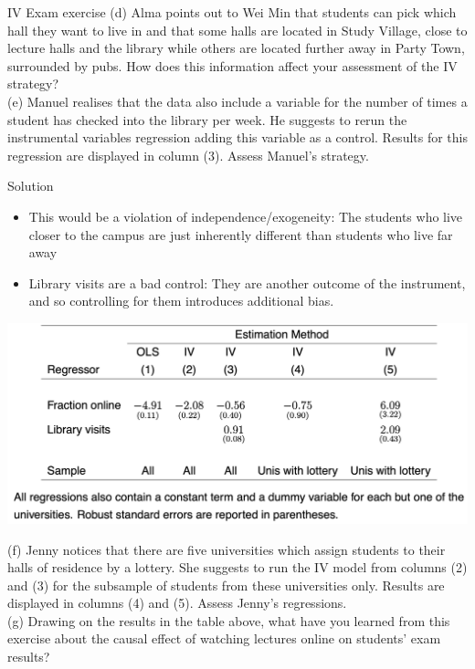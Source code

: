 \documentclass[11pt,xcolor=table]{beamer}
\begin{document}
\begin{frame}[allowframebreaks]{IV Exam exercise}
\framebreak
(d) Alma points out to Wei Min that students can pick which hall they want to live in and that some halls are located in Study Village, close to lecture halls and the library while others are located further away in Party Town, surrounded by pubs. How does this information affect your assessment of the IV strategy?\\
(e) Manuel realises that the data also include a variable for the number of times a student has checked into the library per week. He suggests to rerun the instrumental variables regression adding this variable as a control. Results for this regression are displayed in column (3). Assess Manuel’s strategy.

\framebreak 
\alert{Solution}
\begin{itemize}
    \item This would be a violation of independence/exogeneity: The students who live closer to the campus are just inherently different than students who live far away
    \item Library visits are a bad control: They are another outcome of the instrument, and so controlling for them introduces additional bias.
\end{itemize}

\framebreak 
\includegraphics[width=1.0\textwidth]{tables/IV_Table.png}

\framebreak 


(f) Jenny notices that there are five universities which assign students to their halls of residence by a lottery. She suggests to run the IV model from columns (2) and (3) for the subsample of students from these universities only. Results are displayed in columns (4) and (5). Assess Jenny’s regressions.\\

(g) Drawing on the results in the table above, what have you learned from this exercise about the causal effect of watching lectures online on students’ exam results?



\end{frame}
\end{document}
